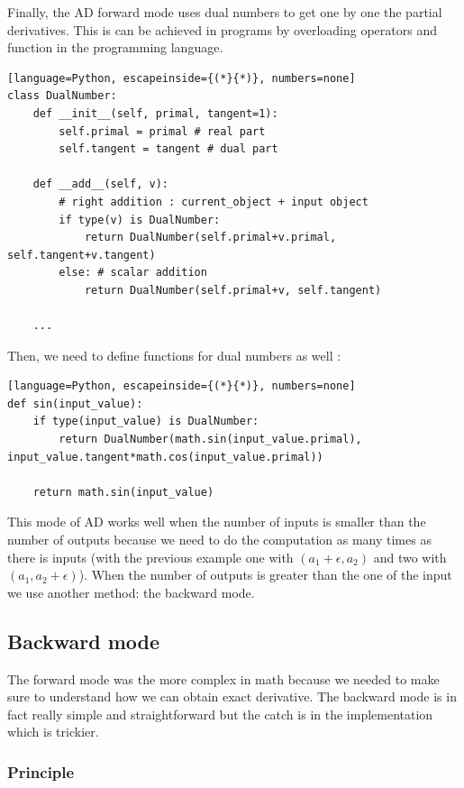 \documentclass[12pt]{article}
\begin{document}
Finally, the AD forward mode uses dual numbers to get one by one the partial derivatives. This is can be achieved in programs by overloading operators and function in the programming language.

\begin{lstlisting}[language=Python, escapeinside={(*}{*)}, numbers=none]
class DualNumber:
    def __init__(self, primal, tangent=1):
        self.primal = primal # real part
        self.tangent = tangent # dual part
    
    def __add__(self, v):
        # right addition : current_object + input object
        if type(v) is DualNumber:
            return DualNumber(self.primal+v.primal, self.tangent+v.tangent)
        else: # scalar addition
            return DualNumber(self.primal+v, self.tangent)
    
    ...
\end{lstlisting}

Then, we need to define functions for dual numbers as well  : 


\begin{lstlisting}[language=Python, escapeinside={(*}{*)}, numbers=none]
def sin(input_value):
    if type(input_value) is DualNumber:
        return DualNumber(math.sin(input_value.primal), input_value.tangent*math.cos(input_value.primal))
    
    return math.sin(input_value)
\end{lstlisting}


This mode of AD works well when the number of inputs is smaller than the number of outputs because we need to do the computation as many times as there is inputs (with the previous example one with $(a_1 + \epsilon, a_2)$ and two with $(a_1, a_2+\epsilon)$). When the number of outputs is greater than the one of the input we use another method: the backward mode.


\subsection{Backward mode}

The forward mode was the more complex in math because we needed to make sure to understand how we can obtain exact derivative. The backward mode is in fact really simple and straightforward but the catch is in the implementation which is trickier. 

\subsubsection{Principle}
\end{document}
